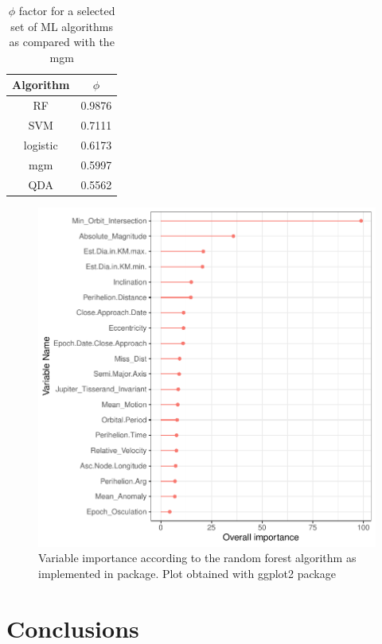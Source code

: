 \documentclass[12pt,%
               a4paper,%
               oneside,openany,%
               titlepage,%
               headinclude,footinclude,%
               BCOR5mm,%
               cleardoublepage=empty,%
               tablecaptionabove,%
               floatperchapter,
               ]{scrreprt}                 %
\begin{document}
\begin{table}[]
\caption{$\phi$ factor for a selected set of ML algorithms as compared with the mgm}
\begin{center}
\begin{tabular}{c|c}
Algorithm & $\phi$ \\ \hline
RF        & 0.9876 \\ \hline
SVM       & 0.7111 \\ \hline
logistic  & 0.6173 \\ \hline
mgm       & 0.5997 \\ \hline
QDA       & 0.5562 
\end{tabular}
\end{center}
\label{phi_values}
\end{table}

\begin{figure}[h]
\begin{center}
\includegraphics[width=1\textwidth]{Figures/RF_Importance.pdf}
\caption{Variable importance according to the random forest algorithm as implemented in \cite{rfor} package. Plot obtained with ggplot2 package \cite{ggplot2}}
\label{RF_Importance}
\end{center}
\end{figure}


\chapter{Conclusions}
\end{document}
